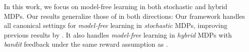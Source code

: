 In this work, we focus on model-free learning in both stochastic and hybrid MDPs. Our results generalize those of \cite{liu2025decision} in both directions: Our framework handles all canonical settings for \emph{model-free} learning in \emph{stochastic} MDPs, improving previous results by \cite{foster2024model}. It also handles \emph{model-free} learning in \emph{hybrid} MDPs with \emph{bandit} feedback under the same reward assumption as \cite{liu2025decision}.  %



